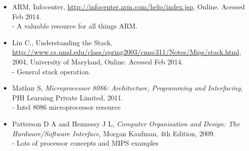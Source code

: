 \documentclass[12pt,a4paper]{article}
\begin{document}
\begin{itemize}
   \item{
      ARM, 
      Infocenter,
      \url{http://infocenter.arm.com/help/index.jsp},
      Online. Acessed Feb 2014.\\
      - A valuable resource for all things ARM.
   }
   \item{
      Lin C.,
      Understanding the Stack,
      \url{http://www.cs.umd.edu/class/spring2003/cmsc311/Notes/Mips/stack.html},
      2004,
      University of Maryland,
      Online. Acessed Feb 2014.\\
      - General stack operation.

   }
   \item{
      Mathur S,
      \emph{Microprocessor 8086: Architecture, Programming and Interfacing},
      PHI Learning Private Limited,
      2011.\\
      - Intel 8086 microprocessor resource
   }
   \item{
      Patterson D A and Hennessy J L,
      \emph{Computer Organisation and Design: The Hardware/Software Interface},
      Morgan Kaufman,
      4th Edition,
      2009.\\
      - Lots of processor concepts and MIPS examples
   }
\end{itemize}

%
%
%
%
%
%
\end{document}
